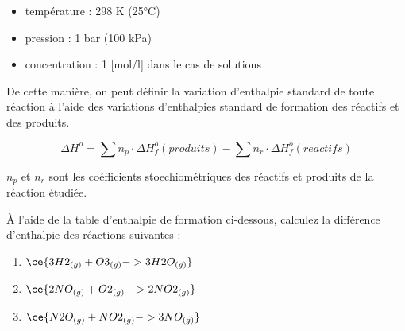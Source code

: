 \documentclass[
  11pt,
  a4paper,
  openany]{book}
\providecommand{\tightlist}{%
  \setlength{\itemsep}{0pt}\setlength{\parskip}{0pt}}
\begin{document}
\begin{itemize}
\tightlist
\item
  température : 298 K (25°C)
\item
  pression : 1 bar (100 kPa)
\item
  concentration : 1 {[}mol/l{]} dans le cas de solutions
\end{itemize}

De cette manière, on peut définir la variation d'enthalpie standard de toute réaction à l'aide des variations d'enthalpies standard de formation des réactifs et des produits.

\[
\Delta H^o = \sum n_p \cdot \Delta H^{o}_f(produits) - \sum n_r \cdot \Delta H^{o}_f(reactifs)
\]

\(n_p\) et \(n_r\) sont les coéfficients stoechiométriques des réactifs et produits de la réaction étudiée.

\begin{Exercise}

À l'aide de la table d'enthalpie de formation ci-dessous, calculez la différence d'enthalpie des réactions suivantes :

\begin{enumerate}
\def\labelenumi{\arabic{enumi}.}
\tightlist
\item
  \(\ce{3H2_{(g)} + O3_{(g)} -> 3H2O_{(g)}}\)
\item
  \(\ce{2NO_{(g)} + O2_{(g)} -> 2NO2_{(g)}}\)
\item
  \(\ce{N2O_{(g)} + NO2_{(g)} -> 3NO_{(g)}}\)
\end{enumerate}

\end{Exercise}
\end{document}
